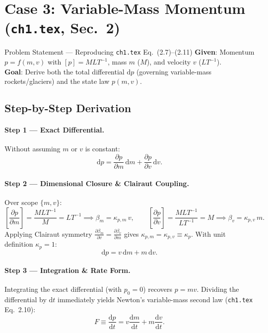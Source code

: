 \documentclass[11pt,a4paper]{article}
\newcommand{\dd}{\mathrm{d}}
\newcommand{\pd}[2]{\frac{\partial #1}{\partial #2}}
\newcommand{\td}[2]{\frac{\dd #1}{\dd #2}}
\newcommand{\dimbr}[1]{\left[#1\right]}
\begin{document}
\section{Case 3: Variable-Mass Momentum (\texttt{ch1.tex}, Sec.~2)}

\begin{setupbox}{Problem Statement — Reproducing \texttt{ch1.tex} Eq.~(2.7)--(2.11)}
\textbf{Given}: Momentum $p = f(m, v)$ with $\dimbr{p} = MLT^{-1}$, mass $m$ ($M$), and velocity $v$ ($LT^{-1}$).\\
\textbf{Goal}: Derive both the total differential $\dd p$ (governing variable-mass rockets/glaciers) and the state law $p(m, v)$.
\end{setupbox}

\subsection*{Step-by-Step Derivation}

\paragraph{Step 1 — Exact Differential.}
Without assuming $m$ or $v$ is constant:
\begin{equation}
  \dd p = \pd{p}{m}\,\dd m + \pd{p}{v}\,\dd v.
\end{equation}

\paragraph{Step 2 — Dimensional Closure \& Clairaut Coupling.}
Over scope $\{m, v\}$:
\[
  \dimbr{\pd{p}{m}} = \frac{MLT^{-1}}{M} = LT^{-1} \implies \beta_m = \kappa_{p,m}\,v,
  \qquad
  \dimbr{\pd{p}{v}} = \frac{MLT^{-1}}{LT^{-1}} = M \implies \beta_v = \kappa_{p,v}\,m.
\]
Applying Clairaut symmetry $\pd{\beta_m}{v} = \pd{\beta_v}{m}$ gives $\kappa_{p,m} = \kappa_{p,v} \equiv \kappa_p$. With unit definition $\kappa_p = 1$:
\begin{equation}
  \dd p = v\,\dd m + m\,\dd v.
\end{equation}

\paragraph{Step 3 — Integration \& Rate Form.}
Integrating the exact differential (with $p_0 = 0$) recovers $p = mv$. Dividing the differential by $\dd t$ immediately yields Newton's variable-mass second law (\texttt{ch1.tex} Eq.~2.10):
\begin{equation}
  F \equiv \td{p}{t} = v\td{m}{t} + m\td{v}{t}.
\end{equation}
\end{document}
